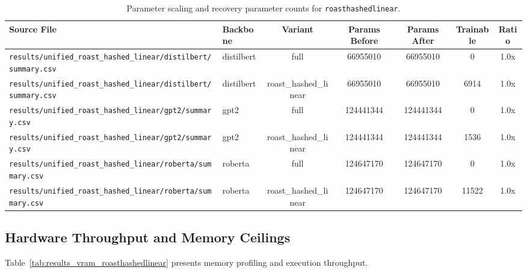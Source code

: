 \begin{table}[t]
\centering
\small
\begin{tabular}{llccccc}
\toprule
\textbf{Source File} & \textbf{Backbone} & \textbf{Variant} & \textbf{Params Before} & \textbf{Params After} & \textbf{Trainable} & \textbf{Ratio} \\
\midrule
\texttt{results/unified\_roast\_hashed\_linear/distilbert/summary.csv} & distilbert & full & 66955010 & 66955010 & 0 & 1.0x \\
\texttt{results/unified\_roast\_hashed\_linear/distilbert/summary.csv} & distilbert & roast\_hashed\_linear & 66955010 & 66955010 & 6914 & 1.0x \\
\texttt{results/unified\_roast\_hashed\_linear/gpt2/summary.csv} & gpt2 & full & 124441344 & 124441344 & 0 & 1.0x \\
\texttt{results/unified\_roast\_hashed\_linear/gpt2/summary.csv} & gpt2 & roast\_hashed\_linear & 124441344 & 124441344 & 1536 & 1.0x \\
\texttt{results/unified\_roast\_hashed\_linear/roberta/summary.csv} & roberta & full & 124647170 & 124647170 & 0 & 1.0x \\
\texttt{results/unified\_roast\_hashed\_linear/roberta/summary.csv} & roberta & roast\_hashed\_linear & 124647170 & 124647170 & 11522 & 1.0x \\
\bottomrule
\end{tabular}
\caption{Parameter scaling and recovery parameter counts for \texttt{roasthashedlinear}.}
\label{tab:results_params_roasthashedlinear}
\end{table}

\subsection{Hardware Throughput and Memory Ceilings}
Table~\ref{tab:results_vram_roasthashedlinear} presents memory profiling and execution throughput.

